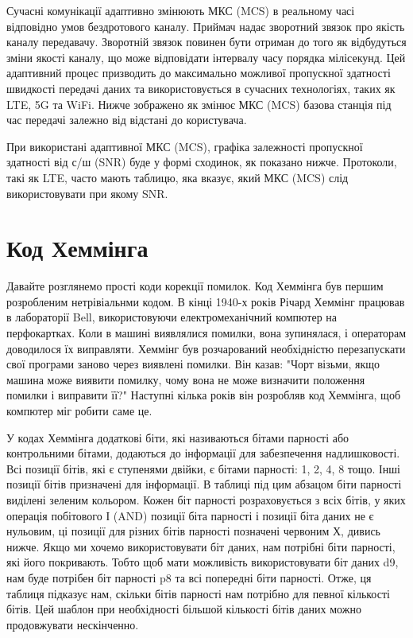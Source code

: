 Сучасні комунікації адаптивно змінюють МКС (MCS) в реальному часі
відповідно умов бездротового каналу. Приймач надає зворотний
зв\textquotesingle язок про якість каналу передавачу. Зворотній
зв\textquotesingle язок повинен бути отриман до того як відбудуться
зміни якості каналу, що може відповідати інтервалу часу порядка
мілісекунд. Цей адаптивний процес призводить до максимально можливої
пропускної здатності швидкості передачі даних та використовується в
сучасних технологіях, таких як LTE, 5G та WiFi. Нижче зображено як
змінює МКС (MCS) базова станція під час передачі залежно від відстані до
користувача.

\href{../_images/adaptive_mcs.svg}{}

При використані адаптивної МКС (MCS), графіка залежності пропускної
здатності від с/ш (SNR) буде у формі сходинок, як показано нижче.
Протоколи, такі як LTE, часто мають таблицю, яка вказує, який МКС (MCS)
слід використовувати при якому SNR.

\href{../_images/adaptive_mcs2.svg}{}

\section{Код
Хеммінга}\label{ux43aux43eux434-ux445ux435ux43cux43cux456ux43dux433ux430}

Давайте розглянемо прості коди корекції помилок. Код Хеммінга був першим
розробленим нетрівіальнми кодом. В кінці 1940-х років Річард Хеммінг
працював в лабораторії Bell, використовуючи електромеханічний
комп\textquotesingle ютер на перфокартках. Коли в машині виявлялися
помилки, вона зупинялася, і операторам доводилося їх виправляти. Хеммінг
був розчарований необхідністю перезапускати свої програми заново через
виявлені помилки. Він казав: "Чорт візьми, якщо машина може виявити
помилку, чому вона не може визначити положення помилки і виправити її?"
Наступні кілька років він розробляв код Хеммінга, щоб
комп\textquotesingle ютер міг робити саме це.

У кодах Хеммінга додаткові біти, які називаються бітами парності або
контрольними бітами, додаються до інформації для забезпечення
надлишковості. Всі позиції бітів, які є ступенями двійки, є бітами
парності: 1, 2, 4, 8 тощо. Інші позиції бітів призначені для інформації.
В таблиці під цим абзацом біти парності виділені зеленим кольором. Кожен
біт парності розраховується з всіх бітів, у яких операція побітового І
(AND) позиції біта парності і позиції біта даних не є нульовим, ці
позиції для різних бітів парності позначені червоним Х, дивись нижче.
Якщо ми хочемо використовувати біт даних, нам потрібні біти парності,
які його покривають. Тобто щоб мати можливість використовувати біт даних
d9, нам буде потрібен біт парності p8 та всі попередні біти парності.
Отже, ця таблиця підказує нам, скільки бітів парності нам потрібно для
певної кількості бітів. Цей шаблон при необхідності більшой кількості
бітів даних можно продовжувати нескінченно.

